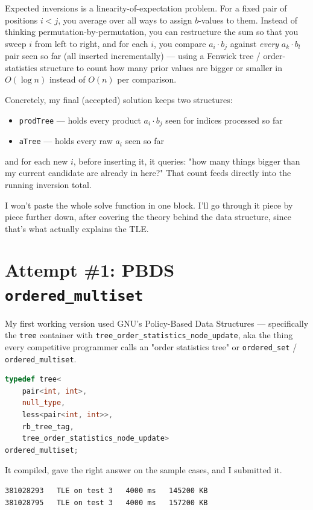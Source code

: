 \documentclass[11pt,a4paper]{article}
\begin{document}
Expected inversions is a linearity-of-expectation problem. For a fixed pair of positions $i < j$, you average over all ways to assign $b$-values to them. Instead of thinking permutation-by-permutation, you can restructure the sum so that you sweep $i$ from left to right, and for each $i$, you compare $a_i \cdot b_j$ against \emph{every} $a_k \cdot b_l$ pair seen so far (all inserted incrementally) --- using a Fenwick tree / order-statistics structure to count how many prior values are bigger or smaller in $O(\log n)$ instead of $O(n)$ per comparison.

Concretely, my final (accepted) solution keeps two structures:

\begin{itemize}
\item \texttt{prodTree} --- holds every product $a_i \cdot b_j$ seen for indices processed so far
\item \texttt{aTree} --- holds every raw $a_i$ seen so far
\end{itemize}

and for each new $i$, before inserting it, it queries: "how many things bigger than my current candidate are already in here?" That count feeds directly into the running inversion total.

I won't paste the whole solve function in one block. I'll go through it piece by piece further down, after covering the theory behind the data structure, since that's what actually explains the TLE.

\section{Attempt \#1: PBDS \texttt{ordered\_multiset}}

My first working version used GNU's Policy-Based Data Structures --- specifically the \texttt{tree} container with \texttt{tree\_order\_statistics\_node\_update}, aka the thing every competitive programmer calls an "order statistics tree" or \texttt{ordered\_set} / \texttt{ordered\_multiset}.

\begin{lstlisting}[language=C++]
typedef tree<
    pair<int, int>,
    null_type,
    less<pair<int, int>>,
    rb_tree_tag,
    tree_order_statistics_node_update>
ordered_multiset;
\end{lstlisting}

It compiled, gave the right answer on the sample cases, and I submitted it.

\begin{lstlisting}
381028293   TLE on test 3   4000 ms   145200 KB
381028795   TLE on test 3   4000 ms   157200 KB
\end{lstlisting}
\end{document}

